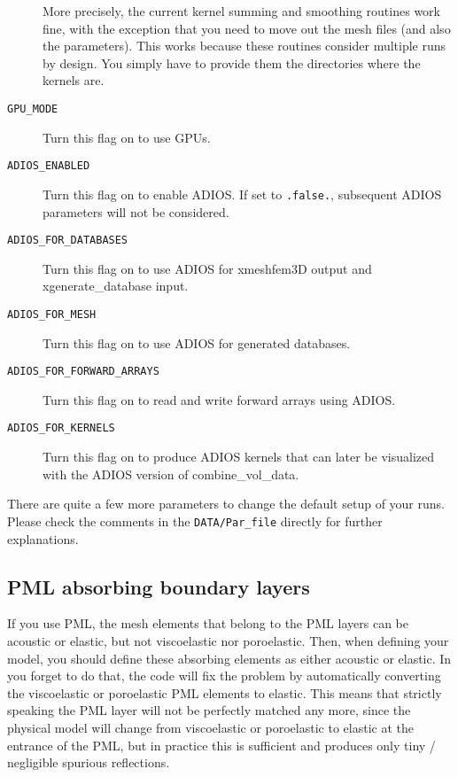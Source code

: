 \begin{description}
More precisely, the current kernel summing and smoothing routines work fine, with the exception that you need to move out the mesh files (and also the parameters). This works because these routines consider multiple runs by design. You simply have to provide them the directories where the kernels are.

\item [{\texttt{GPU\_MODE}}] Turn this flag on to use GPUs.

\item [\texttt{ADIOS\_ENABLED}] Turn this flag on to enable ADIOS. If set to \texttt{.false.}, subsequent ADIOS
parameters will not be considered.
\item [\texttt{ADIOS\_FOR\_DATABASES}] Turn this flag on to use ADIOS for xmeshfem3D output and
xgenerate\_database input.
\item [\texttt{ADIOS\_FOR\_MESH}]  Turn this flag on to use ADIOS for generated databases.
\item [\texttt{ADIOS\_FOR\_FORWARD\_ARRAYS}] Turn this flag on to read and write forward arrays using ADIOS.
\item [\texttt{ADIOS\_FOR\_KERNELS}] Turn this flag on to produce ADIOS kernels that can later be visualized with the ADIOS version of combine\_vol\_data.
\end{description}
There are quite a few more parameters to change the default setup of your runs. Please check the comments in the \texttt{DATA/Par\_file} directly for further explanations.\newline


\subsection{PML absorbing boundary layers}

If you use PML, the mesh elements that belong to the PML layers can
be acoustic or elastic, but not viscoelastic nor poroelastic. Then,
when defining your model, you should define these absorbing elements
as either acoustic or elastic. In you forget to do that, the code
will fix the problem by automatically converting the viscoelastic
or poroelastic PML elements to elastic. This means that strictly speaking
the PML layer will not be perfectly matched any more, since the physical
model will change from viscoelastic or poroelastic to elastic at the
entrance of the PML, but in practice this is sufficient and produces
only tiny / negligible spurious reflections.

